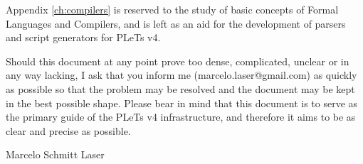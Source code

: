 Appendix \ref{ch:compilers} is reserved to the study of basic concepts of Formal Languages and Compilers, and is left as an aid for the development of parsers and script generators for PLeTs v4.

Should this document at any point prove too dense, complicated, unclear or in any way lacking, I ask that you inform me (marcelo.laser@gmail.com) as quickly as possible so that the problem may be resolved and the document may be kept in the best possible shape. Please bear in mind that this document is to serve as the primary guide of the PLeTs v4 infrastructure, and therefore it aims to be as clear and precise as possible.

Marcelo Schmitt Laser
